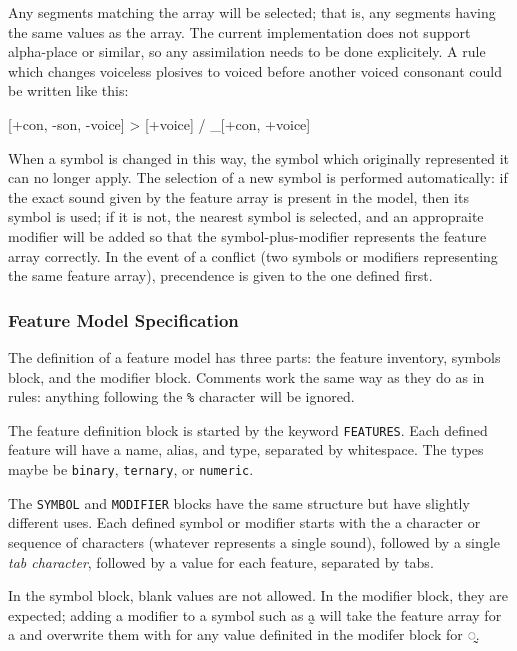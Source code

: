 \documentclass[10pt,letterpaper]{article}
\newcommand\textIPA[1]{{\fontIPA #1}}
\newcounter{excounter}
\newenvironment{vex}[1]{
	\vspace{1em}
	\refstepcounter{excounter}
	\noindent\makebox[3em][l]{(\arabic{excounter}\label{#1})}
	\minipage{\textwidth}
	\verbatim
}{
	\endverbatim
	\endminipage
	\vspace{1em}
}
\begin{document}
\noindent
Any segments matching the array will be selected; that is, any segments having the same values as the array. The current implementation does not support alpha-place or similar, so any assimilation needs to be done explicitely. A rule which changes voiceless plosives to voiced before another voiced consonant could be written like this:

\begin{vex}{ex:voicing_assimilation}
[+con, -son, -voice] > [+voice] / _[+con, +voice]
\end{vex}

When a symbol is changed in this way, the symbol which originally represented it can no longer apply. The selection of a new symbol is performed automatically: if the exact sound given by the feature array is present in the model, then its symbol is used; if it is not, the nearest symbol is selected, and an appropraite modifier will be added so that the symbol-plus-modifier represents the feature array correctly. In the event of a conflict (two symbols or modifiers representing the same feature array), precendence is given to the one defined first.

\subsubsection{Feature Model Specification}
\label{ssub:feature_model_specification}
The definition of a feature model has three parts: the feature inventory, symbols block, and the modifier block. Comments work the same way as they do as in rules: anything following the \texttt{\%} character will be ignored.

The feature definition block is started by the keyword \texttt{FEATURES}. Each defined feature will have a name, alias, and type, separated by whitespace. The types maybe be \texttt{binary}, \texttt{ternary}, or \texttt{numeric}. 

The \texttt{SYMBOL} and \texttt{MODIFIER} blocks have the same structure but have slightly different uses. Each defined symbol or modifier starts with the a character or sequence of characters (whatever represents a single sound), followed by a single \emph{tab character}, followed by a value for each feature, separated by tabs.

In the symbol block, blank values are not allowed. In the modifier block, they are expected; adding a modifier to a symbol such as \textIPA{a̰} will take the feature array for \textIPA{a} and overwrite them with for any value definited in the modifer block for \textIPA{◌̰}.
\end{document}
